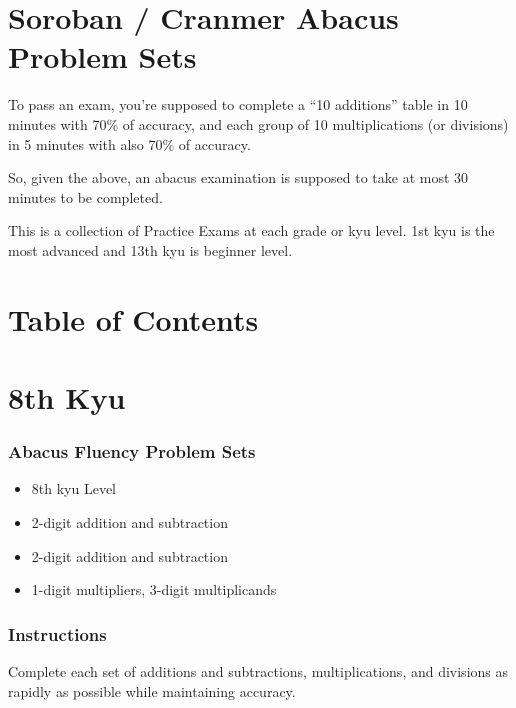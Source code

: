 \hypertarget{soroban-cranmer-abacus-problem-sets}{%
\section{Soroban / Cranmer Abacus Problem
Sets}\label{soroban-cranmer-abacus-problem-sets}}

To pass an exam, you're supposed to complete a ``10 additions'' table in
10 minutes with 70\% of accuracy, and each group of 10 multiplications
(or divisions) in 5 minutes with also 70\% of accuracy.

So, given the above, an abacus examination is supposed to take at most
30 minutes to be completed.

This is a collection of Practice Exams at each grade or kyu level. 1st
kyu is the most advanced and 13th kyu is beginner level.

\hypertarget{table-of-contents}{%
\section{Table of Contents}\label{table-of-contents}}

\hypertarget{th-kyu}{%
\section{8th Kyu}\label{th-kyu}}

\hypertarget{abacus-fluency-problem-sets}{%
\subsubsection{Abacus Fluency Problem
Sets}\label{abacus-fluency-problem-sets}}

\begin{itemize}
\item
  8th kyu Level
\item
  2-digit addition and subtraction
\item
  2-digit addition and subtraction
\item
  1-digit multipliers, 3-digit multiplicands
\end{itemize}

\hypertarget{instructions}{%
\subsubsection{Instructions}\label{instructions}}

Complete each set of additions and subtractions, multiplications, and
divisions as rapidly as possible while maintaining accuracy.

